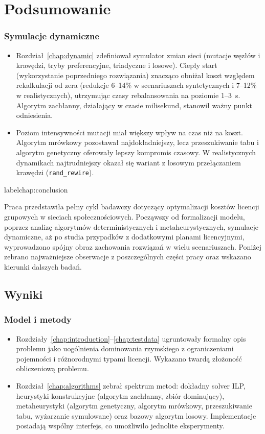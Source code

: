 \chapter{Podsumowanie}
\subsection{Symulacje dynamiczne}
\begin{itemize}
  \item Rozdział~\ref{chap:dynamic} zdefiniował symulator zmian sieci (mutacje węzłów i krawędzi, tryby preferencyjne, triadyczne i losowe). Ciepły start (wykorzystanie poprzedniego rozwiązania) znacząco obniżał koszt względem rekalkulacji od zera (redukcje 6--14\% w scenariuszach syntetycznych i 7--12\% w realistycznych), utrzymując czasy rebalansowania na poziomie 1--3~s. Algorytm zachłanny, działający w czasie milisekund, stanowił ważny punkt odniesienia.
  \item Poziom intensywności mutacji miał większy wpływ na czas niż na koszt. Algorytm mrówkowy pozostawał najdokładniejszy, lecz przeszukiwanie tabu i algorytm genetyczny oferowały lepszy kompromis czasowy. W realistycznych dynamikach najtrudniejszy okazał się wariant z losowym przełączaniem krawędzi (\texttt{rand\_rewire}).
\end{itemize}label{chap:conclusion}

Praca przedstawiła pełny cykl badawczy dotyczący optymalizacji kosztów licencji grupowych w sieciach społecznościowych. Począwszy od formalizacji modelu, poprzez analizę algorytmów deterministycznych i metaheurystycznych, symulacje dynamiczne, aż po studia przypadków z dodatkowymi planami licencyjnymi, wyprowadzono spójny obraz zachowania rozwiązań w wielu scenariuszach. Poniżej zebrano najważniejsze obserwacje z poszczególnych części pracy oraz wskazano kierunki dalszych badań.

\section{Wyniki}

\subsection*{Model i metody}
\begin{itemize}
  \item Rozdziały~\ref{chap:introduction}--\ref{chap:testdata} ugruntowały formalny opis problemu jako uogólnienia dominowania rzymskiego z ograniczeniami pojemności i różnorodnymi typami licencji. Wykazano twardą złożoność obliczeniową problemu.
  \item Rozdział~\ref{chap:algorithms} zebrał spektrum metod: dokładny solver ILP, heurystyki konstrukcyjne (algorytm zachłanny, zbiór dominujący), metaheurystyki (algorytm genetyczny, algorytm mrówkowy, przeszukiwanie tabu, wyżarzanie symulowane) oraz bazowy algorytm losowy. Implementacje posiadają wspólny interfejs, co umożliwiło jednolite eksperymenty.
\end{itemize}


